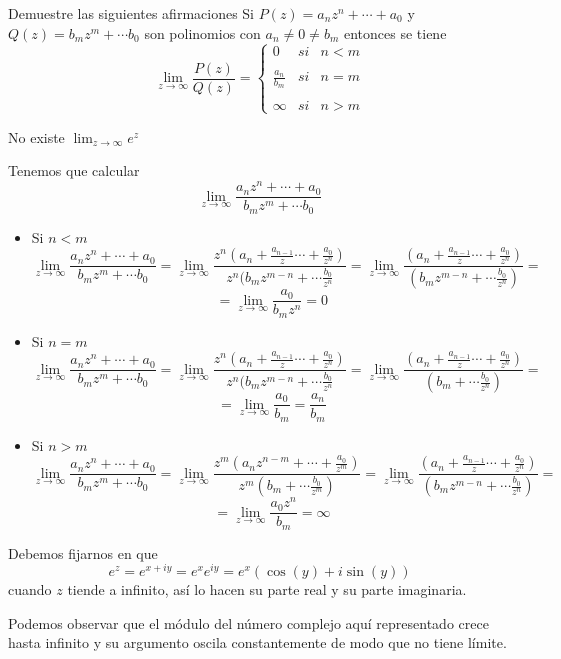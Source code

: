 \begin{problem}[5]
Demuestre las siguientes afirmaciones
\ppart Si $P(z)=a_nz^n+\cdots + a_0$ y $Q(z)=b_mz^m+\cdots b_0$ son polinomios con $a_n \neq 0 \neq b_m$ entonces se tiene
\[\lim_{z \to \infty} \frac{P(z)}{Q(z)} = \left\{
\begin{array}{lcc}
    0& si & n < m \\
    \\ \frac{a_n}{b_m} & si & n=m \\
 \\ \infty & si & n > m
 \end{array} \right.\]

\ppart
No existe $\lim_{z \to \infty}e^z$
\solution
{}

\spart
Tenemos que calcular
\[\lim_{z \to \infty}\frac{a_nz^n+\cdots + a_0}{b_mz^m+\cdots b_0}\]
\begin{itemize}
\item Si $n<m$
\[\lim_{z \to \infty}\frac{a_nz^n+\cdots + a_0}{b_mz^m+\cdots b_0} = \lim_{z \to \infty}\frac{z^n(a_n+\frac{a_{n-1}}{z}\cdots + \frac{a_0}{z^n})}{z^n(b_mz^{m-n}+\cdots \frac{b_0}{z^n}}=\lim_{z \to \infty}\frac{(a_n+\frac{a_{n-1}}{z}\cdots + \frac{a_0}{z^n})}{(b_mz^{m-n}+\cdots \frac{b_0}{z^n})} = \]
\[=\lim_{z \to \infty}\frac{a_0}{b_mz^n} = 0\]

\item
Si $n=m$
\[\lim_{z \to \infty}\frac{a_nz^n+\cdots + a_0}{b_mz^m+\cdots b_0} = \lim_{z \to \infty}\frac{z^n(a_n+\frac{a_{n-1}}{z}\cdots + \frac{a_0}{z^n})}{z^n(b_mz^{m-n}+\cdots \frac{b_0}{z^n}}=\lim_{z \to \infty}\frac{(a_n+\frac{a_{n-1}}{z}\cdots + \frac{a_0}{z^n})}{(b_m+\cdots \frac{b_0}{z^n})} = \]
\[=\lim_{z \to \infty}\frac{a_0}{b_m} = \frac{a_n}{b_m}\]

\item Si $n>m$
\[\lim_{z \to \infty}\frac{a_nz^n+\cdots + a_0}{b_mz^m+\cdots b_0} = \lim_{z \to \infty}\frac{z^m(a_nz^{n-m}+\cdots + \frac{a_0}{z^m})}{z^m(b_m+\cdots \frac{b_0}{z^m})}=\lim_{z \to \infty}\frac{(a_n+\frac{a_{n-1}}{z}\cdots + \frac{a_0}{z^n})}{(b_mz^{m-n}+\cdots \frac{b_0}{z^n})} = \]
\[=\lim_{z \to \infty}\frac{a_0z^n}{b_m} = \infty\]
\end{itemize}

\spart

Debemos fijarnos en que
\[e^z=e^{x+iy}=e^xe^{iy}=e^x\left(\cos(y)+i\sin(y)\right)\]
cuando $z$ tiende a infinito, así lo hacen su parte real y su parte imaginaria.

Podemos observar que el módulo del número complejo aquí representado crece hasta infinito y su argumento oscila constantemente de modo que no tiene límite.

\end{problem}

